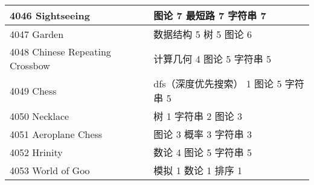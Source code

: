 \begin{longtable}{| p{} | p{} |}
 4046 Sightseeing  & 图论 7 最短路 7 字符串 7 \\ \hline
 4047 Garden  & 数据结构 5 树 5 图论 6 \\ \hline
 4048 Chinese Repeating Crossbow  & 计算几何 4 图论 5 字符串 5 \\ \hline
 4049 Chess  & dfs（深度优先搜索） 1 图论 5 字符串 5 \\ \hline
 4050 Necklace  & 树 1 字符串 2 图论 3 \\ \hline
 4051 Aeroplane Chess  & 图论 3 概率 3 字符串 3 \\ \hline
 4052 Hrinity  & 数论 4 图论 5 字符串 5 \\ \hline
 4053 World of Goo  & 模拟 1 数论 1 排序 1 \\ \hline
\end{longtable}
